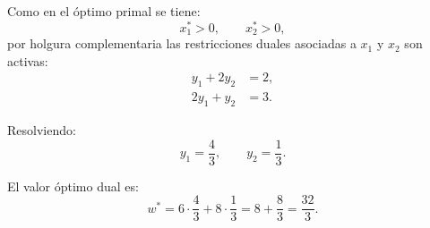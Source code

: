 \begin{enumerate}
Como en el óptimo primal se tiene:
\begin{equation}
x_1^*>0,
\qquad
x_2^*>0,
\end{equation}
por holgura complementaria las restricciones duales asociadas a $x_1$ y $x_2$ son activas:
\begin{equation}
\begin{aligned}
y_1+2y_2 &= 2,\\
2y_1+y_2 &= 3.
\end{aligned}
\end{equation}

Resolviendo:
\begin{equation}
y_1=\frac{4}{3},
\qquad
y_2=\frac{1}{3}.
\end{equation}

El valor óptimo dual es:
\begin{equation}
w^*
=
6\cdot \frac{4}{3}
+
8\cdot \frac{1}{3}
=
8+\frac{8}{3}
=
\frac{32}{3}.
\end{equation}
\end{enumerate}
